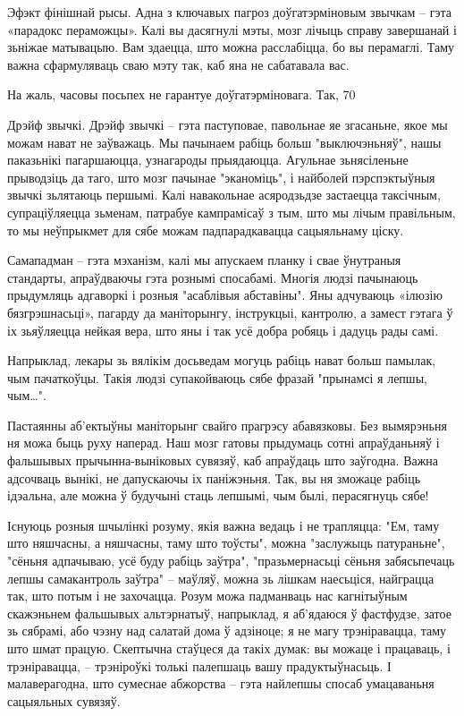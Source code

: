 Эфэкт фінішнай рысы. Адна з ключавых пагроз доўгатэрміновым звычкам – гэта «парадокс пераможцы». Калі вы дасягнулі мэты, мозг лічыць справу завершанай і зьніжае матывацыю. Вам здаецца, што можна расслабіцца, бо вы перамаглі. Таму важна сфармуляваць сваю мэту так, каб яна не сабатавала вас.

На жаль, часовы посьпех не гарантуе доўгатэрміновага. Так, 70%

Дрэйф звычкі. Дрэйф звычкі – гэта паступовае, павольнае яе згасаньне, якое мы можам нават не заўважаць. Мы пачынаем рабіць больш "выключэньняў", нашы паказьнікі пагаршаюцца, узнагароды прыядаюцца. Агульнае зьнясіленьне прыводзіць да таго, што мозг пачынае "эканоміць", і найболей пэрспэктыўныя звычкі зьлятаюць першымі. Калі навакольнае асяродзьдзе застаецца таксічным, супраціўляецца зьменам, патрабуе кампрамісаў з тым, што мы лічым правільным, то мы неўпрыкмет для сябе можам падпарадкавацца сацыяльнаму ціску.

Самападман – гэта мэханізм, калі мы апускаем планку і свае ўнутраныя стандарты, апраўдваючы гэта рознымі спосабамі. Многія людзі пачынаюць прыдумляць адгаворкі і розныя "асаблівыя абставіны". Яны адчуваюць «ілюзію бязгрэшнасьці», пагарду да маніторынгу, інструкцыі, кантролю, а замест гэтага ў іх зьяўляецца нейкая вера, што яны і так усё добра робяць і дадуць рады самі.

Напрыклад, лекары зь вялікім досьведам могуць рабіць нават больш памылак, чым пачаткоўцы. Такія людзі супакойваюць сябе фразай "прынамсі я лепшы, чым…".

Пастаянны аб'ектыўны маніторынг свайго прагрэсу абавязковы. Без вымярэньня ня можа быць руху наперад. Наш мозг гатовы прыдумаць сотні апраўданьняў і фальшывых прычынна-выніковых сувязяў, каб апраўдаць што заўгодна. Важна адсочваць вынікі, не дапускаючы іх паніжэньня. Так, вы ня зможаце рабіць ідэальна, але можна ў будучыні стаць лепшымі, чым былі, перасягнуць сябе!

Існуюць розныя шчылінкі розуму, якія важна ведаць і не трапляцца: "Ем, таму што няшчасны, а няшчасны, таму што тоўсты", можна "заслужыць патураньне", "сёньня адпачываю, усё буду рабіць заўтра", "празьмернасьці сёньня забясьпечаць лепшы самакантроль заўтра" – маўляў, можна зь лішкам наесьціся, найграцца так, што потым і не захочацца. Розум можа падманваць нас кагнітыўным скажэньнем фальшывых альтэрнатыў, напрыклад, я аб'ядаюся ў фастфудзе, затое зь сябрамі, або чэзну над салатай дома ў адзіноце; я не магу трэніравацца, таму што шмат працую. Скептычна стаўцеся да такіх думак: вы можаце і працаваць, і трэніравацца, – трэніроўкі толькі палепшаць вашу прадуктыўнасьць. І малаверагодна, што сумеснае абжорства – гэта найлепшы спосаб умацаваньня сацыяльных сувязяў.

